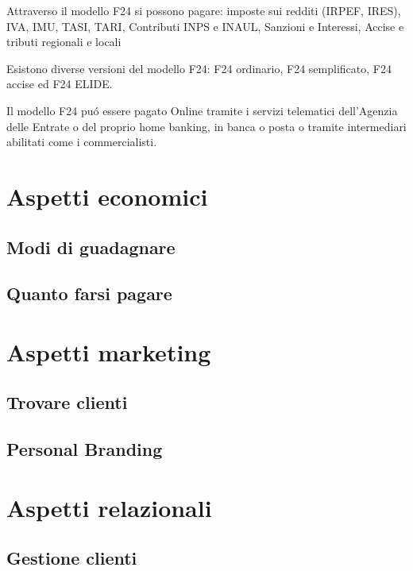 \documentclass{article}
\begin{document}
Attraverso il modello F24 si possono pagare: imposte sui redditi (IRPEF, IRES), IVA, IMU, TASI, TARI, Contributi INPS e INAUL, Sanzioni e Interessi, Accise e tributi regionali e locali

Esistono diverse versioni del modello F24: F24 ordinario, F24 semplificato, F24 accise ed F24 ELIDE.

Il modello F24 pu\'o essere pagato Online tramite i servizi telematici dell'Agenzia delle Entrate o del proprio home banking, in banca o posta o tramite intermediari abilitati come i commercialisti.

\section{Aspetti economici}
\subsection{Modi di guadagnare}
\subsection{Quanto farsi pagare}

\section{Aspetti marketing}
\subsection{Trovare clienti}
\subsection{Personal Branding}

\section{Aspetti relazionali}
\subsection{Gestione clienti}
\end{document}
